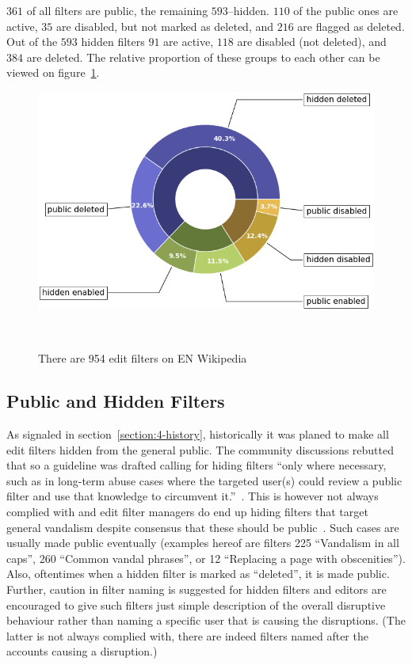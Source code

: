 $361$ of all filters are public, the remaining $593$–hidden.
$110$ of the public ones are active, $35$ are disabled, but not marked as deleted, and $216$ are flagged as deleted.
Out of the $593$ hidden filters $91$ are active, $118$ are disabled (not deleted), and $384$ are deleted.
The relative proportion of these groups to each other can be viewed on figure~\ref{fig:general-stats}.

\begin{figure}
\centering
  \includegraphics[width=0.9\columnwidth]{pics/general-stats-donut.png}
  \caption{There are 954 edit filters on EN Wikipedia}~\label{fig:general-stats}
\end{figure}

\subsection{Public and Hidden Filters}
\label{sec:public-hidden}

As signaled in section~\ref{section:4-history}, historically it was planed to make all edit filters hidden from the general public.
The community discussions rebutted that so a guideline was drafted calling for hiding filters
``only where necessary, such as in long-term abuse cases where the targeted user(s) could review a public filter and use that knowledge to circumvent it.''~\cite{Wikipedia:EditFilter}.
This is however not always complied with and edit filter managers do end up hiding filters that target general vandalism despite consensus that these should be public~\cite{Wikipedia:PrivacyGeneralVandalism}.
Such cases are usually made public eventually (examples hereof are filters 225 ``Vandalism in all caps'', 260 ``Common vandal phrases'', or 12 ``Replacing a page with obscenities'').
Also, oftentimes when a hidden filter is marked as ``deleted'', it is made public. %
Further, caution in filter naming is suggested for hidden filters and editors are encouraged to give such filters just simple description of the overall disruptive behaviour rather than naming a specific user that is causing the disruptions.
(The latter is not always complied with, there are indeed filters named after the accounts causing a disruption.)

